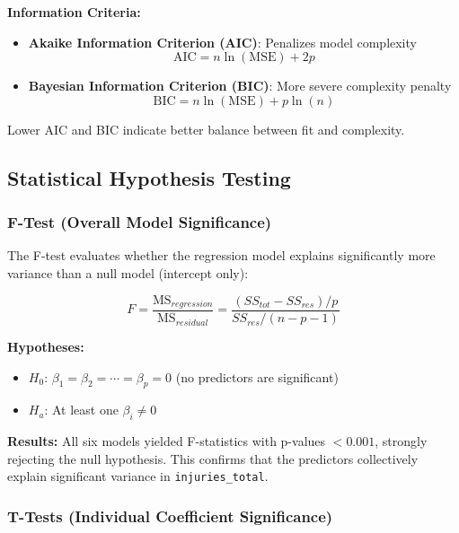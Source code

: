 \documentclass[12pt,man]{apa7}
\begin{document}
\textbf{Information Criteria:}
\begin{itemize}
    \item \textbf{Akaike Information Criterion (AIC)}: Penalizes model complexity
    \begin{equation}
    \text{AIC} = n \ln(\text{MSE}) + 2p
    \end{equation}

    \item \textbf{Bayesian Information Criterion (BIC)}: More severe complexity penalty
    \begin{equation}
    \text{BIC} = n \ln(\text{MSE}) + p \ln(n)
    \end{equation}
\end{itemize}

Lower AIC and BIC indicate better balance between fit and complexity.

\subsection{Statistical Hypothesis Testing}

\subsubsection{F-Test (Overall Model Significance)}

The F-test evaluates whether the regression model explains significantly more variance than a null model (intercept only):

\begin{equation}
F = \frac{\text{MS}_{regression}}{\text{MS}_{residual}} = \frac{(SS_{tot} - SS_{res}) / p}{SS_{res} / (n - p - 1)}
\end{equation}

\textbf{Hypotheses:}
\begin{itemize}
    \item $H_0$: $\beta_1 = \beta_2 = \cdots = \beta_p = 0$ (no predictors are significant)
    \item $H_a$: At least one $\beta_i \neq 0$
\end{itemize}

\textbf{Results:} All six models yielded F-statistics with p-values $< 0.001$, strongly rejecting the null hypothesis. This confirms that the predictors collectively explain significant variance in \texttt{injuries\_total}.

\subsubsection{T-Tests (Individual Coefficient Significance)}
\end{document}
